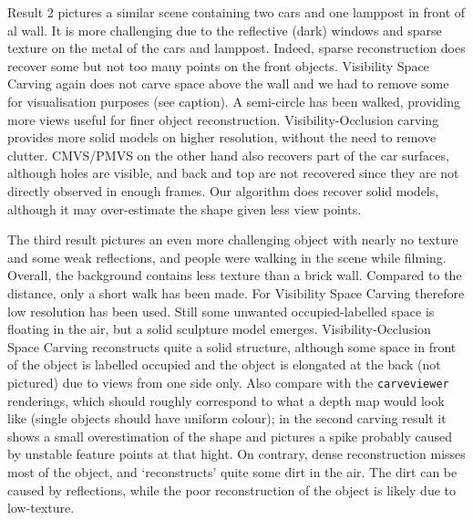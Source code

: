 Result 2 pictures a similar scene containing two cars and one lamppost in front of al wall. It is more challenging due to the reflective (dark) windows and sparse texture on the metal of the cars and lamppost. Indeed, sparse reconstruction does recover some but not too many points on the front objects. Visibility Space Carving again does not carve space above the wall and we had to remove some for visualisation purposes (see caption). A semi-circle has been walked, providing more views useful for finer object reconstruction. Visibility-Occlusion carving provides more solid models on higher resolution, without the need to remove clutter. CMVS/PMVS on the other hand also recovers part of the car surfaces, although holes are visible, and back and top are not recovered since they are not directly observed in enough frames. Our algorithm does recover solid models, although it may over-estimate the shape given less view points.

The third result pictures an even more challenging object with nearly no texture and some weak reflections, and people were walking in the scene while filming. Overall, the background contains less texture than a brick wall. Compared to the distance, only a short walk has been made. For Visibility Space Carving therefore low resolution has been used. Still some unwanted occupied-labelled space is floating in the air, but a solid sculpture model emerges. Visibility-Occlusion Space Carving reconstructs quite a solid structure, although some space in front of the object is labelled occupied and the object is elongated at the back (not pictured) due to views from one side only. Also compare with the \texttt{carveviewer} renderings, which should roughly correspond to what a depth map would look like (\ie single objects should have uniform colour); in the second carving result it shows a small overestimation of the shape and pictures a spike probably caused by unstable feature points at that hight. On contrary, dense reconstruction misses most of the object, and `reconstructs' quite some dirt in the air. The dirt can be caused by reflections, while the poor reconstruction of the object is likely due to low-texture.

